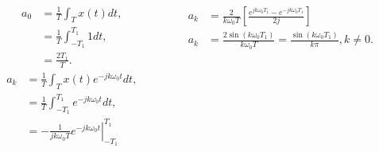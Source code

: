 \begin{frame}
    {
        \begin{columns}
          \begin{column}{0.5\textwidth}
                \begin{equation*}
                    \begin{split}
                       a_0 &= \frac{1}{T} \int_{T}x(t)dt,\\
                       &=  \frac{1}{T} \int_{-T_1}^{T_1}1dt,\\
                       &= \frac{2T_1}{T}.
                    \end{split}
                \end{equation*}
                \pause
                \begin{equation*}
                    \begin{split}
                       a_k &= \frac{1}{T} \int_{T}x(t)e^{-jk\omega_0 t}dt,\\
                       &=  \frac{1}{T} \int_{-T_1}^{T_1}e^{-jk\omega_0 t}dt,\\
                       &= -\left. \frac{1}{jk\omega_0 T}e^{-jk\omega_0 t}\right|^{T_1}_{-T_1}
                    \end{split}
                \end{equation*}
          \end{column}
          \begin{column}{0.5\textwidth}
                \pause

                \pause

                \begin{equation*}
                    \begin{split}
                       a_k &= \frac{2}{k\omega_0 T}\left[\frac{e^{jk\omega_0 T_1} - e^{-jk\omega_0 T_1}}{2j}\right]\\
                       a_k &= \frac{2\sin(k\omega_0 T_1)}{k\omega_0 T} = \frac{\sin(k\omega_0 T_1)}{k\pi}, k \neq 0.
                    \end{split}
                \end{equation*}
          \end{column}
        \end{columns}


    }
\end{frame}

